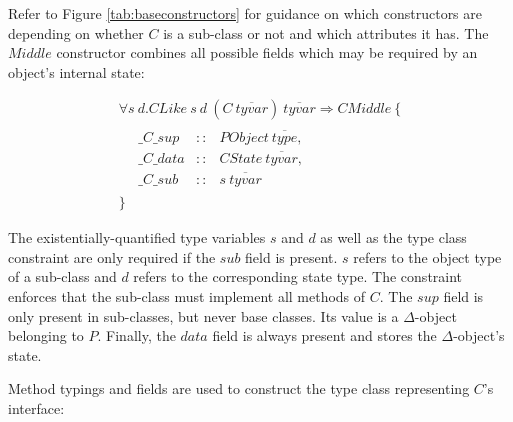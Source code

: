 \documentclass[runningheads,a4paper]{llncs}
\begin{document}
Refer to Figure \ref{tab:baseconstructors} for guidance on which constructors are depending on whether $C$ is a sub-class or not and which attributes it has. The $\mathit{Middle}$ constructor combines all possible fields which may be required by an object's internal state:

\begin{displaymath}
\begin{array}{l}
\forall s~d.\mathit{CLike}~s~d~(\mathit{C}~\overline{\mathit{tyvar}})~\overline{\mathit{tyvar}} \Rightarrow \mathit{CMiddle}~\{\\
   \quad \begin{array}{lcl}
   \_\mathit{C}\_\mathit{sup}  & :: & \mathit{PObject}~\overline{\mathit{type}}, \\
   \_\mathit{C}\_\mathit{data} & :: & \mathit{CState}~\overline{\mathit{tyvar}}, \\
   \_\mathit{C}\_\mathit{sub}  & :: & s~\overline{\mathit{tyvar}}
   \end{array}\\
\}
\end{array}
\end{displaymath}

The existentially-quantified type variables $s$ and $d$ as well as the type class constraint are only required if the $\mathit{sub}$ field is present. $s$ refers to the object type of a sub-class and $d$ refers to the corresponding state type. The constraint enforces that the sub-class must implement all methods of $C$. The $\mathit{sup}$ field is only present in sub-classes, but never base classes. Its value is a $\Delta$-object belonging to $P$. Finally, the $\mathit{data}$ field is always present and stores the $\Delta$-object's state.

Method typings and fields are used to construct the type class representing $C$'s interface: 
\end{document}
